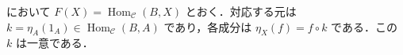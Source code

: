\begin{prop}[表現函手間の自然変換の決定]
 において $F(X)=\operatorname{Hom}_{\mathcal C}(B,X)$ とおく．対応する元は $k=\eta_A(1_A)\in\operatorname{Hom}_{\mathcal C}(B,A)$ であり，各成分は $\eta_X(f)=f\circ k$ である．この $k$ は一意である．
\end{prop}
